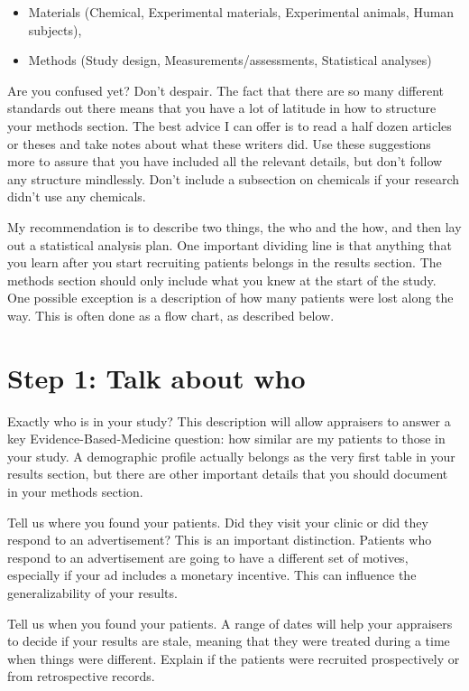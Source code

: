 \documentclass[
  letterpaper,
  DIV=11,
  numbers=noendperiod]{scrreprt}
\providecommand{\tightlist}{%
  \setlength{\itemsep}{0pt}\setlength{\parskip}{0pt}}\usepackage{longtable,booktabs,array}
\begin{document}
\begin{itemize}
\tightlist
\item
  Materials (Chemical, Experimental materials, Experimental animals,
  Human subjects),
\item
  Methods (Study design, Measurements/assessments, Statistical analyses)
\end{itemize}

Are you confused yet? Don't despair. The fact that there are so many
different standards out there means that you have a lot of latitude in
how to structure your methods section. The best advice I can offer is to
read a half dozen articles or theses and take notes about what these
writers did. Use these suggestions more to assure that you have included
all the relevant details, but don't follow any structure mindlessly.
Don't include a subsection on chemicals if your research didn't use any
chemicals.

My recommendation is to describe two things, the who and the how, and
then lay out a statistical analysis plan. One important dividing line is
that anything that you learn after you start recruiting patients belongs
in the results section. The methods section should only include what you
knew at the start of the study. One possible exception is a description
of how many patients were lost along the way. This is often done as a
flow chart, as described below.

\section{Step 1: Talk about who}\label{step-1-talk-about-who}

Exactly who is in your study? This description will allow appraisers to
answer a key Evidence-Based-Medicine question: how similar are my
patients to those in your study. A demographic profile actually belongs
as the very first table in your results section, but there are other
important details that you should document in your methods section.

Tell us where you found your patients. Did they visit your clinic or did
they respond to an advertisement? This is an important distinction.
Patients who respond to an advertisement are going to have a different
set of motives, especially if your ad includes a monetary incentive.
This can influence the generalizability of your results.

Tell us when you found your patients. A range of dates will help your
appraisers to decide if your results are stale, meaning that they were
treated during a time when things were different. Explain if the
patients were recruited prospectively or from retrospective records.
\end{document}
